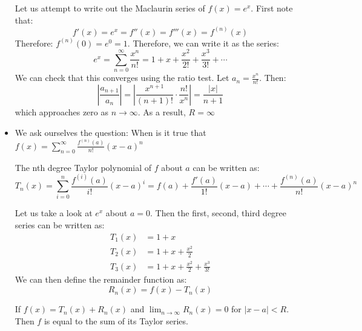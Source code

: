 \begin{itemize}
    \begin{example}
        Let us attempt to write out the Maclaurin series of $f(x)=e^x$. First note that:
        \begin{equation}
            f'(x)=e^x=f''(x)=f'''(x)=f^{(n)}(x)
        \end{equation}
        Therefore: $f^{(n)}(0)=e^0=1$. Therefore, we can write it as the series:
        \begin{equation}
            e^x = \sum_{n=0}^\infty \frac{x^n}{n!} = 1+x+\frac{x^2}{2!}+\frac{x^3}{3!}+\cdots
        \end{equation}
        We can check that this converges using the ratio test. Let $a_n=\frac{x^n}{n!}$. Then:
        \begin{equation}
            \left|\frac{a_{n+1}}{a_n}\right| = \left|\frac{x^{n+1}}{(n+1)!} \cdot \frac{n!}{x^n}\right| = \frac{|x|}{n+1}
        \end{equation}
        which approaches zero as $n\to\infty$. As a result, $R=\infty$
    \end{example}
    \item We ask ourselves the question: When is it true that $f(x)=\sum_{n=0}^\infty \frac{f^{(n)}(a)}{n!}(x-a)^n$
    \begin{definition}
        The nth degree Taylor polynomial of $f$ about $a$ can be written as:
        \begin{equation}
            T_n(x) = \sum_{i=0}^n \frac{f^{(i)}(a)}{i!}(x-a)^i = f(a) + \frac{f'(a)}{1!}(x-a)+\cdots + \frac{f^{(n)}(a)}{n!}(x-a)^n
        \end{equation}
    \end{definition}
    \begin{example}
        Let us take a look at $e^x$ about $a=0$. Then the first, second, third degree series can be written as:
        \begin{align}
            T_1(x) &=  1+x \\ 
            T_2(x) &= 1+x+\frac{x^2}{2} \\ 
            T_3(x) &= 1+x+\frac{x^2}{2}+\frac{x^3}{3!}
        \end{align}
        We can then define the remainder function as:
        \begin{equation}
            R_n(x)=f(x)-T_n(x)
        \end{equation}
    \end{example}
    \begin{theorem}
        If $f(x)=T_n(x)+R_n(x)$ and $\lim_{n\to\infty} R_n(x)=0$ for $|x-a|<R$. Then $f$ is equal to the sum of its Taylor series.
        \vspace{2mm}


\end{theorem}
\end{itemize}
